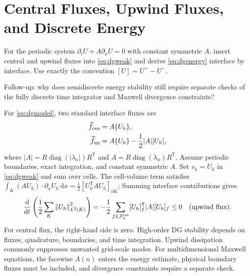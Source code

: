 \documentclass[11pt,openany]{book}
\numberwithin{equation}{chapter}
\theoremstyle{definition}
\theoremstyle{remark}
\newcommand{\dd}{\mathrm d}
\newcommand{\norm}[1]{\left\lVert #1\right\rVert}
\begin{document}
\section{Central Fluxes, Upwind Fluxes, and Discrete Energy}\label{sec:dg-energy}
\begin{askai}
For the periodic system $\partial_tU+A\partial_xU=0$ with constant symmetric $A$,
insert central and upwind fluxes into \eqref{eq:dgweak} and derive \eqref{eq:dgenergy} interface by interface.
Use exactly the convention $[U]=U^+-U^-$.

Follow-up: why does semidiscrete energy stability still require separate checks of the fully discrete time integrator and Maxwell divergence constraints?
\end{askai}
For \eqref{eq:dgmodel}, two standard interface fluxes are
\begin{align}\label{eq:dg-fluxes}
\widehat f_{\rm cen}&=A\{U_h\},\\
\widehat f_{\rm up}&=A\{U_h\}-\frac12|A|[U_h],
\end{align}
where $|A|=R\operatorname{diag}(|\lambda_\alpha|)R^\mathsf T$ and
$A=R\operatorname{diag}(\lambda_\alpha)R^\mathsf T$.
Assume periodic boundaries, exact integration, and constant symmetric $A$.
Set $v_h=U_h$ in \eqref{eq:dgweak} and sum over cells.
The cell-volume term satisfies
$\int_K (AU_h)\cdot\partial_xU_h\,\dd x
=\tfrac12[U_h^\mathsf TAU_h]_{\partial K}$;
Summing interface contributions gives
\begin{equation}\label{eq:dgenergy}
\frac{\dd}{\dd t}\left(\frac12\sum_K\norm{U_h}_{L^2(K)}^2\right)
=-\frac12\sum_{f\in\mathcal F_h^{\rm int}}
[U_h]_f^\mathsf T|A|[U_h]_f\leq0
\quad\text{(upwind flux)}.
\end{equation}
For central flux, the right-hand side is zero.
High-order DG stability depends on fluxes, quadrature, boundaries, and time integration.
Upwind dissipation commonly suppresses unwanted grid-scale modes.
For multidimensional Maxwell equations, the facewise $A(n)$ enters the energy estimate,
physical boundary fluxes must be included, and divergence constraints require a separate check.
\end{document}
